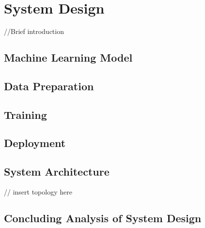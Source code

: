 \chapter{System Design}
//Brief introduction 

\section{Machine Learning Model}

\section{Data Preparation}

\section{Training}

\section{Deployment}

\section{System Architecture}
// insert topology here


\section{Concluding Analysis of System Design}
